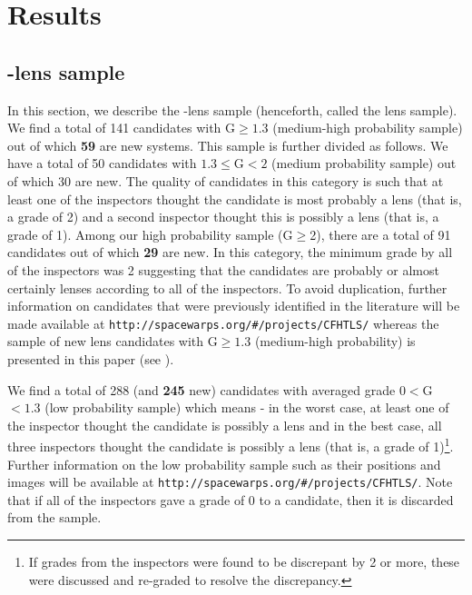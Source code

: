 \documentclass[useAMS,usenatbib,a4paper]{mn2e}
\begin{document}
\section{Results}
\label{sec:results}

\subsection{\sw-\cfhtls lens sample}
\label{sec:swlens}

In this section, we describe the \sw-\cfhtls lens sample (henceforth,
called the \sw lens sample). We find a total of 141 candidates with
G$\ge1.3$ (medium-high probability sample) out of which {\bf 59} are new
systems. This sample is further divided as follows. We have a total of
50 candidates with $1.3\le$G$<2$ (medium probability sample) out of
which 30 are new. The quality of candidates in this category is such
that at least one of the inspectors thought the candidate is most
probably a lens (that is, a grade of 2) and a second inspector thought
this is possibly a lens (that is, a grade of 1). Among our high
probability sample (G$\ge$2), there are a total of 91 candidates out of
which {\bf 29} are new. In this category, the minimum grade by all of the
inspectors was 2 suggesting that the candidates are probably or almost
certainly lenses according to all of the inspectors. To avoid
duplication, further information on \sw candidates that were previously
identified in the literature will be made available at
\texttt{http://spacewarps.org/\#/projects/CFHTLS/} whereas the sample of new lens
candidates with G$\ge 1.3$ (medium-high probability) is presented in
this paper (see ).

We find a total of 288 (and {\bf 245} new) candidates with averaged grade
$0<$G$<1.3$ (low probability sample) which means - in the worst case, at
least one of the inspector thought the candidate is possibly a lens and
in the best case, all three inspectors thought the candidate is possibly
a lens (that is, a grade of 1)\footnote{If grades from the inspectors
were found to be discrepant by 2 or more, these were discussed and
re-graded to resolve the discrepancy.}. Further information on the low
probability sample such as their positions and images will be available
at \texttt{http://spacewarps.org/\#/projects/CFHTLS/}. Note that if all of the
inspectors gave a grade of 0 to a candidate, then it is discarded from
the sample.
\end{document}
